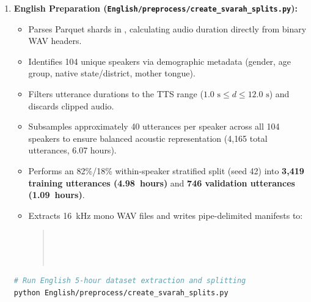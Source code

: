 \documentclass[11pt,a4paper]{report}
\begin{document}
\begin{enumerate}
    \item \textbf{English Preparation (\texttt{English/preprocess/create\_svarah\_splits.py}):}
    \begin{itemize}
        \item Parses Parquet shards in , calculating audio duration directly from binary WAV headers.
        \item Identifies 104 unique speakers via demographic metadata (gender, age group, native state/district, mother tongue).
        \item Filters utterance durations to the TTS range ($1.0\text{ s} \le d \le 12.0\text{ s}$) and discards clipped audio.
        \item Subsamples approximately 40 utterances per speaker across all 104 speakers to ensure balanced acoustic representation (4{,}165 total utterances, 6.07 hours).
        \item Performs an 82\%/18\% within-speaker stratified split (seed 42) into \textbf{3{,}419 training utterances (4.98~hours)} and \textbf{746 validation utterances (1.09~hours)}.
        \item Extracts 16~kHz mono WAV files and writes pipe-delimited manifests to:
        \begin{quote}
        \\
        \\
        \\
        \end{quote}
    \end{itemize}
\begin{lstlisting}[language=bash]
# Run English 5-hour dataset extraction and splitting
python English/preprocess/create_svarah_splits.py
\end{lstlisting}


\end{enumerate}
\end{document}
